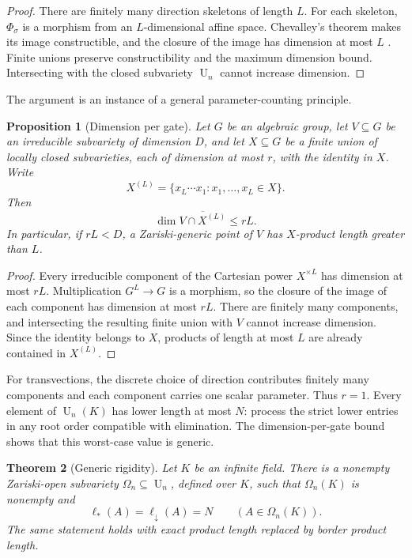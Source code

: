 \documentclass[11pt]{amsart}
\numberwithin{equation}{section}
\newtheorem{theorem}{Theorem}[section]
\newtheorem{proposition}[theorem]{Proposition}
\theoremstyle{definition}
\theoremstyle{remark}
\newcommand{\U}{\operatorname{U}}
\newcommand{\ellDown}{\ell_{\downarrow}}
\newcommand{\ellAll}{\ell_{*}}
\begin{document}
\begin{proof}
There are finitely many direction skeletons of length $L$.  For each skeleton, $\Phi_\sigma$ is a morphism from an $L$-dimensional affine space.  Chevalley's theorem makes its image constructible, and the closure of the image has dimension at most $L$ \cite{Hartshorne1977}.  Finite unions preserve constructibility and the maximum dimension bound.  Intersecting with the closed subvariety $\U_n$ cannot increase dimension.
\end{proof}

The argument is an instance of a general parameter-counting principle.

\begin{proposition}[Dimension per gate]\label{prop:dimension-per-gate}
Let $G$ be an algebraic group, let $V\subseteq G$ be an irreducible subvariety of dimension $D$, and let $X\subseteq G$ be a finite union of locally closed subvarieties, each of dimension at most $r$, with the identity in $X$.  Write
\[
X^{(L)}
=
\{x_L\cdots x_1:x_1,\ldots,x_L\in X\}.
\]
Then
\[
\dim\overline{V\cap X^{(L)}}\le rL.
\]
In particular, if $rL<D$, a Zariski-generic point of $V$ has $X$-product length greater than $L$.
\end{proposition}

\begin{proof}
Every irreducible component of the Cartesian power $X^{\times L}$ has dimension at most $rL$.  Multiplication $G^L\to G$ is a morphism, so the closure of the image of each component has dimension at most $rL$.  There are finitely many components, and intersecting the resulting finite union with $V$ cannot increase dimension.  Since the identity belongs to $X$, products of length at most $L$ are already contained in $X^{(L)}$.
\end{proof}

For transvections, the discrete choice of direction contributes finitely many components and each component carries one scalar parameter.  Thus $r=1$.  Every element of $\U_n(K)$ has lower length at most $N$: process the strict lower entries in any root order compatible with elimination.  The dimension-per-gate bound shows that this worst-case value is generic.

\begin{theorem}[Generic rigidity]\label{thm:generic-rigidity}
Let $K$ be an infinite field.  There is a nonempty Zariski-open subvariety $\Omega_n\subseteq\U_n$, defined over $K$, such that $\Omega_n(K)$ is nonempty and
\[
\ellAll(A)=\ellDown(A)=N
\qquad(A\in\Omega_n(K)).
\]
The same statement holds with exact product length replaced by border product length.
\end{theorem}
\end{document}
